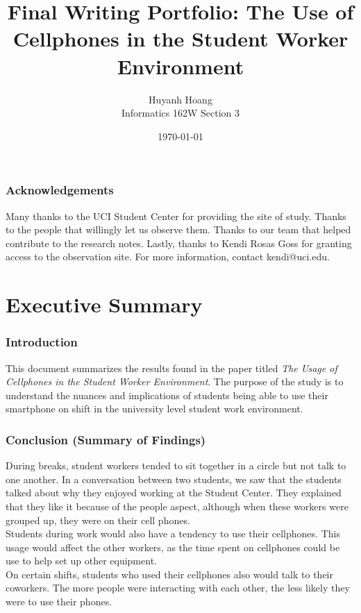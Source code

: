 \documentclass[letterpaper, 12pt]{report}
\title{Final Writing Portfolio: The Use of Cellphones in the Student Worker Environment}
\author{Huyanh Hoang\\ Informatics 162W Section 3}
\date{\today}
\begin{document}
\maketitle
\tableofcontents

\pagebreak
\section*{Acknowledgements}
\noindent Many thanks to the UCI Student Center for providing the site of study. Thanks to the people that willingly let us observe them. Thanks to our team that helped contribute to the research notes. Lastly, thanks to Kendi Rosas Goss for granting access to the observation site. For more information, contact kendi@uci.edu.

\part{Executive Summary}
\section{Introduction}
This document summarizes the results found in the paper titled \textit{The Usage of Cellphones in the Student Worker Environment}. The purpose of the study is to understand the nuances and implications of students being able to use their smartphone on shift in the university level student work environment.

\section{Conclusion (Summary of Findings)}
During breaks, student workers tended to sit together in a circle but not talk to one another. In a conversation between two students, we saw that the students talked about why they enjoyed working at the Student Center. They explained that they like it because of the people aspect, although when these workers were grouped up, they were on their cell phones.\\

Students during work would also have a tendency to use their cellphones. This usage would affect the other workers, as the time spent on cellphones could be use to help set up other equipment.\\

On certain shifts, students who used their cellphones also would talk to their coworkers. The more people were interacting with each other, the less likely they were to use their phones.
\end{document}
